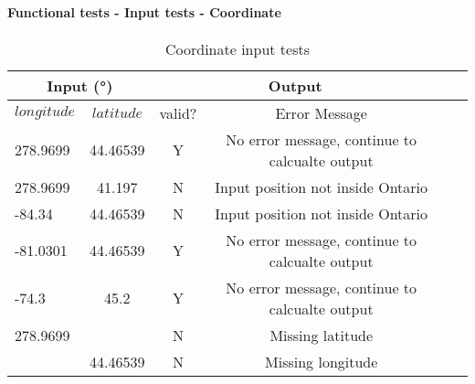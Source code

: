 \documentclass[12pt, titlepage]{article}
\begin{document}
		
\paragraph{Functional tests - Input tests - Coordinate}

\begin{center}
\begin{table}[h]
\resizebox{\textwidth}{!}
{ %
    \begin{tabular}{ lccccc }
    \hline
      \multicolumn{2}{c|}{Input (\si[per-mode=symbol] {\degree}) }                            & \multicolumn{2}{c}{Output} \\ 
    
    \hline
        $longitude$   &   $latitude$     &   valid?   &   Error Message \\ \hline
    
       278.9699  & 44.46539 &  Y  & No error message, continue to calcualte output                         \\  \hline
       278.9699  & 41.197 &  N  & Input position not inside Ontario                         \\  \hline
       -84.34  & 44.46539 &  N  & Input position not inside Ontario                         \\  \hline
       -81.0301  & 44.46539 &  Y  & No error message, continue to calcualte output                          \\  \hline
       -74.3  & 45.2 &  Y  &  No error message, continue to calcualte output                       \\   \hline
       278.9699  &  &  N  & Missing latitude                         \\   \hline
      &  44.46539 &  N  & Missing longitude                       \\

    
    \hline
    
    
    \end{tabular} %
}
\caption{Coordinate input tests}
\label{Table:coordinate_test}
\end{table}
\end{center}
\end{document}
